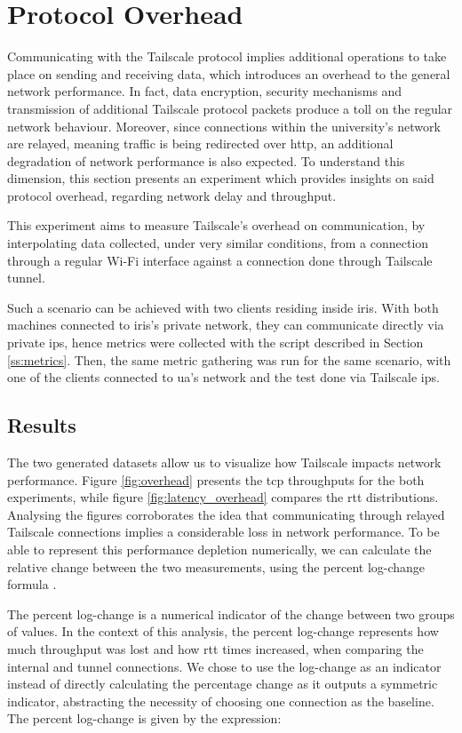 \documentclass[11pt,twoside,a4paper]{report}
\begin{document}
\section{Protocol Overhead}

Communicating with the Tailscale protocol implies additional operations  to take place on sending and receiving data, which introduces an overhead to the general network performance. In fact, data encryption, security mechanisms and transmission of additional Tailscale protocol packets produce a toll on the regular network behaviour. Moreover, since connections within the university's network are relayed, meaning traffic is being redirected over \ac{http}, an additional degradation of network performance is also expected. To understand this dimension, this section presents an experiment which provides insights on said protocol overhead, regarding network delay and throughput.

This experiment aims to measure Tailscale's overhead on communication, by interpolating data collected, under very similar conditions, from a connection through a regular Wi-Fi interface against a connection done through Tailscale tunnel.

Such a scenario can be achieved with two clients residing inside \ac{iris}. With both machines connected to \ac{iris}'s private network, they can communicate directly via private \acp{ip}, hence metrics were collected with the script described in Section \ref{ss:metrics}. Then, the same metric gathering was run for the same scenario, with one of the clients connected to \ac{ua}'s network and the test done via Tailscale \acp{ip}.

\subsection{Results}

The two generated datasets allow us to visualize how Tailscale impacts network performance. Figure \ref{fig:overhead} presents the \ac{tcp} throughputs for the both experiments, while figure \ref{fig:latency_overhead} compares the \ac{rtt} distributions. Analysing the figures corroborates the idea that communicating through relayed Tailscale connections implies a considerable loss in network performance. To be able to represent this performance depletion numerically, we can calculate the relative change between the two measurements, using the percent log-change formula \cite{tornqvist1985should}.

The percent log-change is a numerical indicator of the change between two groups of values. In the context of this analysis, the percent log-change represents how much throughput was lost and how \ac{rtt} times increased, when comparing the internal and tunnel connections. We chose to use the log-change as an indicator instead of directly calculating the percentage change as it outputs a symmetric indicator, abstracting the necessity of choosing one connection as the baseline. The percent log-change is given by the expression:
\end{document}
